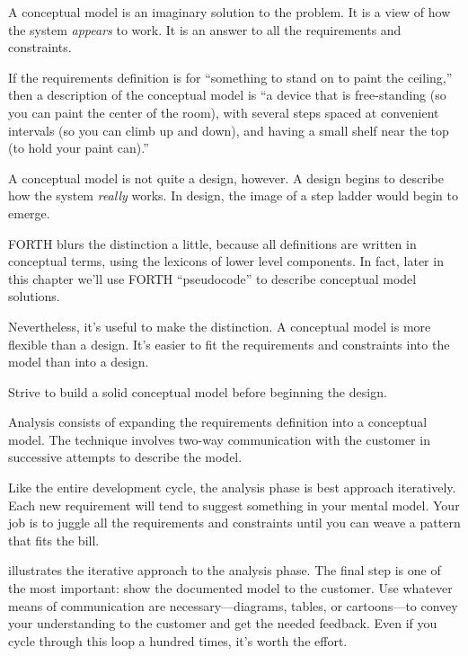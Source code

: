 A conceptual model is an imaginary solution to the problem. It is a
view of how the system \emph{appears} to work. It is an answer to all
the requirements and constraints.


If the requirements definition is for ``something to stand on to paint
the ceiling,'' then a description of the conceptual model is ``a
device that is free-standing (so you can paint the center of the
room), with several steps spaced at convenient intervals (so you can
climb up and down), and having a small shelf near the top (to hold
your paint can).''

A conceptual model is not quite a design, however. A design begins to
describe how the system \emph{really} works. In design, the image of a
step ladder would begin to emerge.

FORTH blurs the distinction a little, because all definitions are
written in conceptual terms, using the lexicons of lower level
components. In fact, later in this chapter we'll use FORTH
``pseudocode'' to describe conceptual model solutions.

Nevertheless, it's useful to make the distinction. A conceptual model
is more flexible than a design. It's easier to fit the requirements
and constraints into the model than into a design.

\begin{tip}
Strive to build a solid conceptual model before beginning the design.
\end{tip}


\noindent Analysis consists of expanding the requirements definition into a
conceptual model. The technique involves two-way communication with the
customer in successive attempts to describe the model.

Like the entire development cycle, the analysis phase is best
approach iteratively. Each new requirement will tend to suggest something
in your mental model. Your job is to juggle all the requirements and
constraints until you can weave a pattern that fits the bill.

 illustrates the iterative approach to the analysis phase.
The final step is one of the most important: show the documented model
to the customer. Use whatever means of communication are
necessary---diagrams, tables, or cartoons---to convey your understanding to
the customer and get the needed feedback. Even if you cycle through this
loop a hundred times, it's worth the effort.

